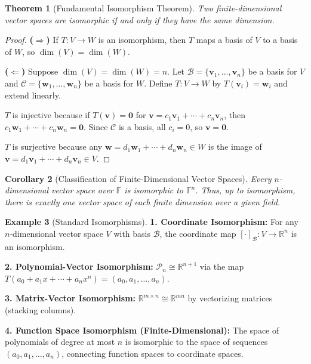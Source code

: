 \documentclass[12pt]{article}
\numberwithin{equation}{section}
\newcommand{\vect}[1]{\boldsymbol{#1}}   %
\theoremstyle{plain}
\newtheorem{theorem}{Theorem}[section]
\newtheorem{corollary}[theorem]{Corollary}
\theoremstyle{definition}
\newtheorem{example}[theorem]{Example}
\theoremstyle{remark}
\begin{document}
\begin{theorem}[Fundamental Isomorphism Theorem]
Two finite-dimensional vector spaces are isomorphic if and only if they have the same dimension.
\end{theorem}

\begin{proof}
\textbf{($\Rightarrow$)} If $T: V \to W$ is an isomorphism, then $T$ maps a basis of $V$ to a basis of $W$, so $\dim(V) = \dim(W)$.

\textbf{($\Leftarrow$)} Suppose $\dim(V) = \dim(W) = n$. Let $\mathcal{B} = \{\vect{v}_1, \ldots, \vect{v}_n\}$ be a basis for $V$ and $\mathcal{C} = \{\vect{w}_1, \ldots, \vect{w}_n\}$ be a basis for $W$. Define $T: V \to W$ by $T(\vect{v}_i) = \vect{w}_i$ and extend linearly.

$T$ is injective because if $T(\vect{v}) = \vect{0}$ for $\vect{v} = c_1\vect{v}_1 + \cdots + c_n\vect{v}_n$, then $c_1\vect{w}_1 + \cdots + c_n\vect{w}_n = \vect{0}$. Since $\mathcal{C}$ is a basis, all $c_i = 0$, so $\vect{v} = \vect{0}$.

$T$ is surjective because any $\vect{w} = d_1\vect{w}_1 + \cdots + d_n\vect{w}_n \in W$ is the image of $\vect{v} = d_1\vect{v}_1 + \cdots + d_n\vect{v}_n \in V$.
\end{proof}

\begin{corollary}[Classification of Finite-Dimensional Vector Spaces]
Every $n$-dimensional vector space over $\mathbb{F}$ is isomorphic to $\mathbb{F}^n$. Thus, up to isomorphism, there is exactly one vector space of each finite dimension over a given field.
\end{corollary}

\begin{example}[Standard Isomorphisms]
\textbf{1. Coordinate Isomorphism:}
For any $n$-dimensional vector space $V$ with basis $\mathcal{B}$, the coordinate map $[\cdot]_{\mathcal{B}}: V \to \mathbb{R}^n$ is an isomorphism.

\textbf{2. Polynomial-Vector Isomorphism:}
$\mathcal{P}_n \cong \mathbb{R}^{n+1}$ via the map $T(a_0 + a_1x + \cdots + a_nx^n) = (a_0, a_1, \ldots, a_n)$.

\textbf{3. Matrix-Vector Isomorphism:}
$\mathbb{R}^{m \times n} \cong \mathbb{R}^{mn}$ by vectorizing matrices (stacking columns).

\textbf{4. Function Space Isomorphism (Finite-Dimensional):}
The space of polynomials of degree at most $n$ is isomorphic to the space of sequences $(a_0, a_1, \ldots, a_n)$, connecting function spaces to coordinate spaces.
\end{example}
\end{document}
